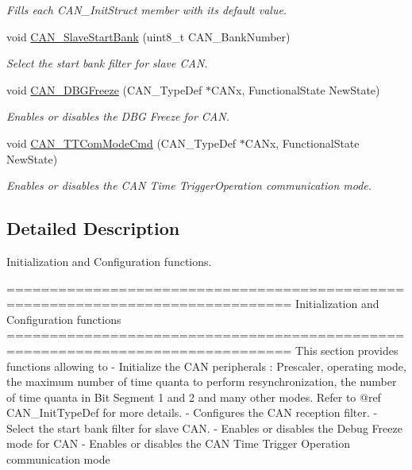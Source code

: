 \begin{DoxyCompactItemize}
\begin{DoxyCompactList}\small\item\em Fills each C\-A\-N\-\_\-\-Init\-Struct member with its default value. \end{DoxyCompactList}\item 
void \hyperlink{group___c_a_n___group1_ga109ff8960bc59f44b984c9646f17b3c0}{C\-A\-N\-\_\-\-Slave\-Start\-Bank} (uint8\-\_\-t C\-A\-N\-\_\-\-Bank\-Number)
\begin{DoxyCompactList}\small\item\em Select the start bank filter for slave C\-A\-N. \end{DoxyCompactList}\item 
void \hyperlink{group___c_a_n___group1_gac0e2d33e08caf49d1f1251f0dcc20213}{C\-A\-N\-\_\-\-D\-B\-G\-Freeze} (C\-A\-N\-\_\-\-Type\-Def $\ast$C\-A\-Nx, Functional\-State New\-State)
\begin{DoxyCompactList}\small\item\em Enables or disables the D\-B\-G Freeze for C\-A\-N. \end{DoxyCompactList}\item 
void \hyperlink{group___c_a_n___group1_ga94740177bab153ca5b102d122f9a8cca}{C\-A\-N\-\_\-\-T\-T\-Com\-Mode\-Cmd} (C\-A\-N\-\_\-\-Type\-Def $\ast$C\-A\-Nx, Functional\-State New\-State)
\begin{DoxyCompactList}\small\item\em Enables or disables the C\-A\-N Time Trigger\-Operation communication mode. \end{DoxyCompactList}\end{DoxyCompactItemize}


\subsection{Detailed Description}
Initialization and Configuration functions. \begin{DoxyVerb} ===============================================================================
                      Initialization and Configuration functions
 ===============================================================================  
  This section provides functions allowing to 
   - Initialize the CAN peripherals : Prescaler, operating mode, the maximum number 
     of time quanta to perform resynchronization, the number of time quanta in
     Bit Segment 1 and 2 and many other modes. 
     Refer to  @ref CAN_InitTypeDef  for more details.
   - Configures the CAN reception filter.                                      
   - Select the start bank filter for slave CAN.
   - Enables or disables the Debug Freeze mode for CAN
   - Enables or disables the CAN Time Trigger Operation communication mode\end{DoxyVerb}
 

